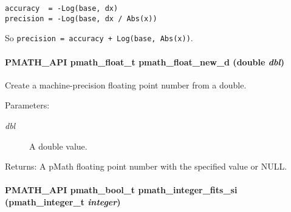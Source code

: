 \begin{Code}\begin{verbatim}accuracy  = -Log(base, dx)
precision = -Log(base, dx / Abs(x))
\end{verbatim}
\end{Code}



So {\tt precision = accuracy + Log(base, Abs(x))}. \hypertarget{group__numbers_g5c3beb5316feb510ee46f72f11b49117}{
\paragraph[{pmath\_\-float\_\-new\_\-d}]{\setlength{\rightskip}{0pt plus 5cm}PMATH\_\-API {\bf pmath\_\-float\_\-t} pmath\_\-float\_\-new\_\-d (double {\em dbl})}\hfill}
\label{group__numbers_g5c3beb5316feb510ee46f72f11b49117}


Create a machine-precision floating point number from a double. 

\begin{Desc}
\item[Parameters:]
\begin{description}
\item[{\em dbl}]A double value. \end{description}
\end{Desc}
\begin{Desc}
\item[Returns:]A pMath floating point number with the specified value or NULL. \end{Desc}
\hypertarget{group__numbers_gc220e06754067b9ba4a7c823017ad32e}{
\paragraph[{pmath\_\-integer\_\-fits\_\-si}]{\setlength{\rightskip}{0pt plus 5cm}PMATH\_\-API {\bf pmath\_\-bool\_\-t} pmath\_\-integer\_\-fits\_\-si ({\bf pmath\_\-integer\_\-t} {\em integer})}\hfill}
\label{group__numbers_gc220e06754067b9ba4a7c823017ad32e}


